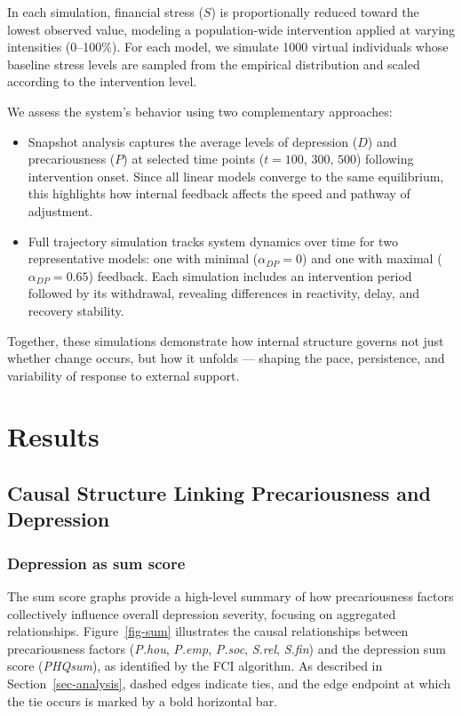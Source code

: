 \documentclass[
]{article}
\begin{document}
In each simulation, financial stress (\(S\)) is proportionally reduced
toward the lowest observed value, modeling a population-wide
intervention applied at varying intensities (0--100\%). For each model,
we simulate 1000 virtual individuals whose baseline stress levels are
sampled from the empirical distribution and scaled according to the
intervention level.

We assess the system's behavior using two complementary approaches:

\begin{itemize}
\item
  Snapshot analysis captures the average levels of depression (\(D\))
  and precariousness (\(P\)) at selected time points (\(t = 100\),
  \(300\), \(500\)) following intervention onset. Since all linear
  models converge to the same equilibrium, this highlights how internal
  feedback affects the speed and pathway of adjustment.
\item
  Full trajectory simulation tracks system dynamics over time for two
  representative models: one with minimal (\(\alpha_{DP} = 0\)) and one
  with maximal (\(\alpha_{DP} = 0.65\)) feedback. Each simulation
  includes an intervention period followed by its withdrawal, revealing
  differences in reactivity, delay, and recovery stability.
\end{itemize}

Together, these simulations demonstrate how internal structure governs
not just whether change occurs, but how it unfolds --- shaping the pace,
persistence, and variability of response to external support.

\section{Results}\label{results}

\subsection{Causal Structure Linking Precariousness and
Depression}\label{causal-structure-linking-precariousness-and-depression}

\subsubsection{Depression as sum score}\label{depression-as-sum-score}

The sum score graphs provide a high-level summary of how precariousness
factors collectively influence overall depression severity, focusing on
aggregated relationships. Figure~\ref{fig-sum} illustrates the causal
relationships between precariousness factors (\emph{P.hou},
\emph{P.emp}, \emph{P.soc}, \emph{S.rel}, \emph{S.fin}) and the
depression sum score (\emph{PHQsum}), as identified by the FCI
algorithm. As described in Section~\ref{sec-analysis}, dashed edges
indicate ties, and the edge endpoint at which the tie occurs is marked
by a bold horizontal bar.
\end{document}
